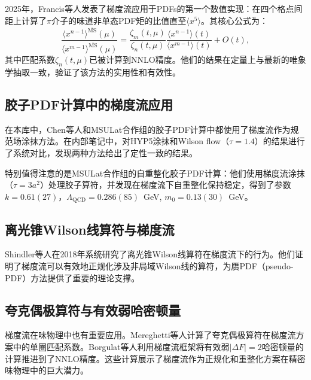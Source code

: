 \documentclass[12pt,a4paper]{ctexart}
\theoremstyle{definition}
\begin{document}
2025年，Francis等人发表了梯度流应用于PDFs的第一个数值实现\cite{Francis2025}：在四个格点间距上计算了$\pi$介子的味道非单态PDF矩的比值直至$\langle x^5 \rangle$。其核心公式为：
\begin{equation}
\frac{\langle x^{n-1} \rangle^{\overline{\text{MS}}}(\mu)}{\langle x^{m-1} \rangle^{\overline{\text{MS}}}(\mu)} =
\frac{\zeta_m(t,\mu)}{\zeta_n(t,\mu)} \frac{\langle x^{n-1} \rangle(t)}{\langle x^{m-1} \rangle(t)} + O(t),
\label{eq:moment_ratio}
\end{equation}
其中匹配系数$\zeta_n(t,\mu)$已被计算到NNLO精度。他们的结果在定量上与最新的唯象学抽取一致，验证了该方法的实用性和有效性。

\subsection{胶子PDF计算中的梯度流应用}

在本库中，Chen等人\cite{Chen2025gluon}和MSULat合作组\cite{NieMiera2025}的胶子PDF计算中都使用了梯度流作为规范场涂抹方法。在内部笔记\cite{NoteGluonPDFs}中，对HYP5涂抹和Wilson flow（$\tau=1.4$）的结果进行了系统对比，发现两种方法给出了定性一致的结果。

特别值得注意的是MSULat合作组的自重整化胶子PDF计算\cite{NieMiera2025}：他们使用梯度流涂抹（$\tau = 3a^2$）处理胶子算符，并发现在梯度流下自重整化保持稳定，得到了参数$k = 0.61(27)$，$\Lambda_{\text{QCD}} = 0.286(85)$~GeV, $m_0 = 0.13(30)$~GeV。

\subsection{离光锥Wilson线算符与梯度流}

Shindler等人在2018年系统研究了离光锥Wilson线算符在梯度流下的行为\cite{OffLightcone2018}。他们证明了梯度流可以有效地正规化涉及非局域Wilson线的算符，为赝PDF（pseudo-PDF）方法提供了重要的理论支撑。

\subsection{夸克偶极算符与有效弱哈密顿量}

梯度流在味物理中也有重要应用。Mereghetti等人计算了夸克偶极算符在梯度流方案中的单圈匹配系数\cite{Mereghetti2022}。Borgulat等人利用梯度流框架将有效弱$|\Delta F|=2$哈密顿量的计算推进到了NNLO精度\cite{Borgulat2024}。这些计算展示了梯度流作为正规化和重整化方案在精密味物理中的巨大潜力。

\end{document}
